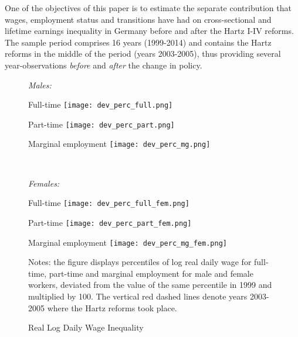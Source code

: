 \documentclass[12pt, a4paper]{article}
\begin{document}
One of the objectives of this paper is to estimate the separate contribution that wages, employment status and transitions have had on cross-sectional and lifetime earnings inequality in Germany before and after the Hartz I-IV reforms. The sample period comprises 16 years (1999-2014) and contains the Hartz reforms in the middle of the period (years 2003-2005), thus providing several year-observations \emph{before} and \emph{after} the change in policy. 

\begin{figure}[!t]
	\centering
	\begin{flushleft}
		\emph{Males:}\\
	\end{flushleft}
	\vspace{2mm}
	\begin{minipage}[b]{0.32\textwidth}{Full-time}
		\centering
		\texttt{[image: dev\_perc\_full.png]}
	\end{minipage}
	\begin{minipage}[b]{0.32\textwidth}{Part-time}
		\centering
		\texttt{[image: dev\_perc\_part.png]}
	\end{minipage}
	\begin{minipage}[b]{0.32\textwidth}{Marginal employment}
		\centering
		\texttt{[image: dev\_perc\_mg.png]}
	\end{minipage}\\
	\vspace{2mm}
	\begin{flushleft}
		\emph{Females:}\\
	\end{flushleft}
	\vspace{2mm}
	\begin{minipage}[b]{0.32\textwidth}{Full-time}
		\centering
		\texttt{[image: dev\_perc\_full\_fem.png]}
	\end{minipage}
	\begin{minipage}[b]{0.32\textwidth}{Part-time}
		\centering
		\texttt{[image: dev\_perc\_part\_fem.png]}
	\end{minipage}
	\begin{minipage}[b]{0.32\textwidth}{Marginal employment}
		\centering
		\texttt{[image: dev\_perc\_mg\_fem.png]}
	\end{minipage}
	\footnotesize{
		\justifying Notes: the figure displays percentiles of log real daily wage for full-time, part-time and marginal employment for male and female workers, deviated from the value of the same percentile in 1999 and multiplied by 100. The vertical red dashed lines denote years 2003-2005 where the Hartz reforms took place.\par}
	\captionsetup{font=small,justification=raggedright}
	\caption{Real Log Daily Wage Inequality}\label{fig:daily_wage}
\end{figure}
\end{document}
